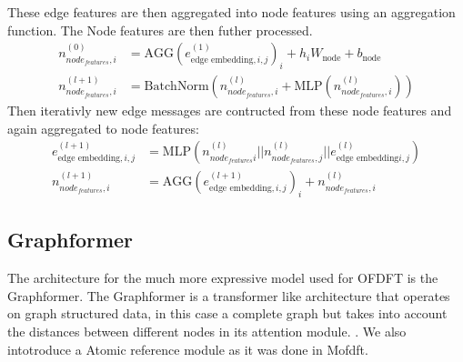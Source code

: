These edge features are then aggregated into node features using an aggregation function. The Node features are then futher processed.
\begin{align}
    n_{node_{features},i}^{(0)} &= \text{AGG}(e_{\text{edge embedding},i,j}^{(1)})_i + h_{i}W_{\text{node}} + b_{\text{node}} \\
    n_{node_{features},i}^{(l+1)} &= \text{BatchNorm}(n_{node_{features},i}^{(l)} + \text{MLP}(n_{node_{features},i}^{(l)}))
\end{align}
Then iterativly new edge messages are contructed from these node features and again aggregated to node features:
\begin{align}
    e_{\text{edge embedding},i,j}^{(l+1)} &= \text{MLP}(n_{node_{features}i}^{(l)}||n_{node_{features},j}^{(l)}||e_{\text{edge embedding}i,j}^{(l)})\\
    n_{node_{features},i}^{(l+1)} &= \text{AGG}(e_{\text{edge embedding},i,j}^{(l+1)})_i + n_{node_{features},i}^{(l)}
\end{align}
\subsection{Graphformer}
The architecture for the much more expressive model used for OFDFT is the Graphformer. The Graphformer is a transformer like architecture that operates on graph structured data, in this case a complete graph but takes into account the distances between different nodes in its attention module. \cite{Graphformer}.
We also intotroduce a Atomic reference module as it was done in Mofdft\cite{zhang_m-ofdft_2023}.
